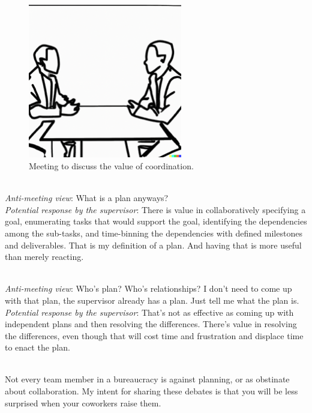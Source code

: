 \begin{figure}%
    \centering
\includegraphics[width=0.6\textwidth,trim={0 .6cm 0 1cm},clip]{images/confrontational_meeting_of_two_people_in_a_conference_room_both_are_seated.pdf}
    \caption{Meeting to discuss the value of coordination.}
    \label{fig:meeting-to-discuss-coordination}
\end{figure}


\ \\
\textit{Anti-meeting view}: What is a plan anyways?\\
\textit{Potential response by the supervisor}: There is value in collaboratively specifying a goal, enumerating tasks that would support the goal, identifying the dependencies among the sub-tasks, and time-binning the dependencies with defined milestones and deliverables. That is my definition of a plan. And having that is more useful than merely reacting.

\ \\
\textit{Anti-meeting view}: Who's plan? Who's relationships? I don't need to come up with that plan, the supervisor already has a plan. Just tell me what the plan is.\\
\textit{Potential response by the supervisor}: That's not as effective as coming up with independent plans and then resolving the differences. There's value in resolving the differences, even though that will cost time and frustration and displace time to enact the plan.


\ \\

Not every team member in a bureaucracy is against planning, or as obstinate about collaboration. 
My intent for sharing these debates is that you will be less surprised when your coworkers raise them. 
